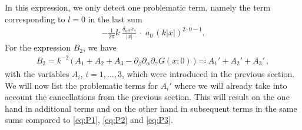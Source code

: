 In this expression, we only detect one problematic term, namely the term corresponding to $l = 0$ in the last sum
\begin{align}
  \label{eq:Q1}
  \tag{Q1}
  -\frac{1}{2\pi} k\;  \frac{\delta_{\alpha\beta} x_\gamma}{|x|}\, \cdot \; a_0 \, (k|x|)^{2 \cdot 0 - 1} .
\end{align}
For the expression $B_2$, we have  
\begin{align*}
  B_2 = k^{-2} \, \Big( \, A_1 + A_2 + A_3 - \partial_\beta\partial_\alpha\partial_\gamma G(x; 0)\, \Big) \eqqcolon A_1' + A_2' + A_3'\,,
\end{align*}
with the variables $A_i$, $i = 1, \dots, 3$, which were introduced in the previous section. 
We will now list the problematic terms for $A_i'$ where we will already take into account the cancellations from the previous section.
This will result on the one hand in additional terms and on the other hand in subsequent terms in the same sums compared to \eqref{eq:P1}, \eqref{eq:P2} and \eqref{eq:P3}.

